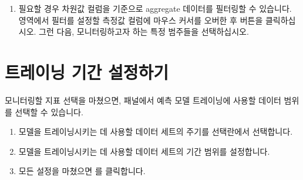 \documentclass[letterpaper,10pt,english]{sphinxmanual}
\begin{document}
\begin{enumerate}
\begin{quote}
\begin{figure}[H]
\centering

\noindent{}
\end{figure}
\end{quote}

\item {} 
필요할 경우 차원값 컬럼을 기준으로 aggregate 데이터를 필터링할 수 있습니다.  영역에서 필터를 설정할 측정값 컬럼에 마우스 커서를 오버한 후  버튼을 클릭하십시오. 그런 다음, 모니터링하고자 하는 특정 범주들을 선택하십시오.
\begin{quote}

\begin{figure}[H]
\centering

\noindent{}
\end{figure}
\end{quote}

\end{enumerate}


\section{트레이닝 기간 설정하기}
\label{\detokenize{anomaly/part02/index:configure-training}}\label{\detokenize{anomaly/part02/index:id4}}
모니터링할 지표 선택을 마쳤으면,  패널에서 예측 모델 트레이닝에 사용할 데이터 범위를 선택할 수 있습니다.
\begin{enumerate}
\def\theenumi{\arabic{enumi}}
\def\labelenumi{\theenumi .}
\makeatletter\def\p@enumii{\p@enumi \theenumi .}\makeatother
\item {} 
모델을 트레이닝시키는 데 사용할 데이터 세트의 주기를  선택란에서 선택합니다.
\begin{quote}

\begin{figure}[H]
\centering

\noindent{}
\end{figure}
\end{quote}

\item {} 
모델을 트레이닝시키는 데 사용할 데이터 세트의 기간 범위를 설정합니다.
\begin{quote}

\begin{figure}[H]
\centering

\noindent{}
\end{figure}
\end{quote}

\item {} 
모든 설정을 마쳤으면 를 클릭합니다.

\end{enumerate}
\end{document}
